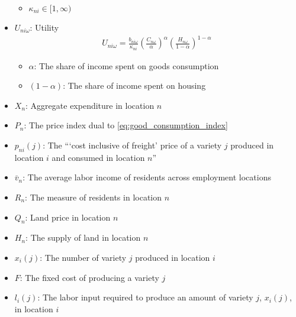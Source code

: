 \begin{itemize}
\begin{itemize}
            \item $\kappa_{n i} \in[1, \infty)$
        \end{itemize}
    \item $U_{n i \omega}$: Utility
        \begin{align}
            U_{n i \omega}=\frac{b_{n i \omega}}{\kappa_{n i}}\left(\frac{C_{n \omega}}{\alpha}\right)^\alpha\left(\frac{H_{n \omega}}{1-\alpha}\right)^{1-\alpha}
        \end{align}
        \begin{itemize}
            \item $\alpha$: The share of income spent on goods consumption
            \item $(1-\alpha)$: The share of income spent on housing
        \end{itemize}
    \item $X_n$: Aggregate expenditure in location $n$
    \item $P_n$: The price index dual to \eqref{eq:good_consumption_index}
    \item $p_{n i}(j)$: The  ```cost inclusive of freight' price of a variety $j$ produced in location $i$ and consumed in location $n$''
    \item $\bar{v}_n$: The average labor income of residents across employment locations
    \item $R_n$: The measure of residents in location $n$
    \item $Q_n$: Land price in location $n$
    \item $H_n$: The supply of land in location $n$
    \item $x_i(j)$: The number of variety $j$ produced in location $i$
    \item $F$: The fixed cost of producing a variety $j$
    \item $l_i(j)$: The labor input required to produce an amount of variety $j$, $x_i(j)$, in location $i$
\end{itemize}
